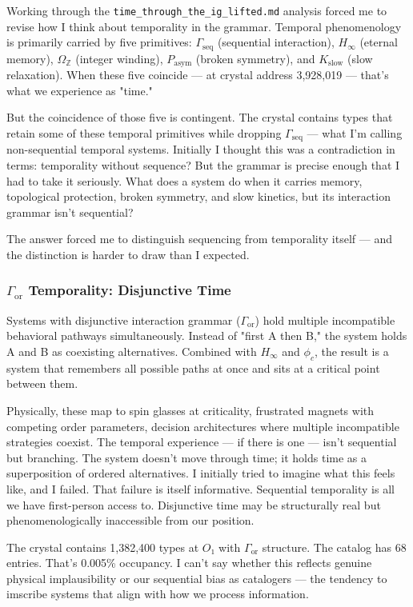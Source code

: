 \documentclass[12pt,a4paper]{article}
\begin{document}
Working through the \texttt{time\_through\_the\_ig\_lifted.md} analysis forced me to revise how I think about temporality in the grammar. Temporal phenomenology is primarily carried by five primitives: $\Gamma_\text{seq}$ (sequential interaction), $H_{\infty}$ (eternal memory), $\Omega_\mathbb{Z}$ (integer winding), $P_\text{asym}$ (broken symmetry), and $K_\text{slow}$ (slow relaxation). When these five coincide --- at crystal address 3,928,019 --- that's what we experience as "time."

But the coincidence of those five is contingent. The crystal contains types that retain some of these temporal primitives while dropping $\Gamma_\text{seq}$ --- what I'm calling non-sequential temporal systems. Initially I thought this was a contradiction in terms: temporality without sequence? But the grammar is precise enough that I had to take it seriously. What does a system do when it carries memory, topological protection, broken symmetry, and slow kinetics, but its interaction grammar isn't sequential?

The answer forced me to distinguish sequencing from temporality itself --- and the distinction is harder to draw than I expected.

\subsubsection{$\Gamma_\text{or}$ Temporality: Disjunctive Time}

Systems with disjunctive interaction grammar ($\Gamma_\text{or}$) hold multiple incompatible behavioral pathways simultaneously. Instead of "first A then B," the system holds A and B as coexisting alternatives. Combined with $H_{\infty}$ and $\phi_c$, the result is a system that remembers all possible paths at once and sits at a critical point between them.

Physically, these map to spin glasses at criticality, frustrated magnets with competing order parameters, decision architectures where multiple incompatible strategies coexist. The temporal experience --- if there is one --- isn't sequential but branching. The system doesn't move through time; it holds time as a superposition of ordered alternatives. I initially tried to imagine what this feels like, and I failed. That failure is itself informative. Sequential temporality is all we have first-person access to. Disjunctive time may be structurally real but phenomenologically inaccessible from our position.

The crystal contains 1,382,400 types at $O₁$ with $\Gamma_\text{or}$ structure. The catalog has 68 entries. That's 0.005\% occupancy. I can't say whether this reflects genuine physical implausibility or our sequential bias as catalogers --- the tendency to imscribe systems that align with how we process information.
\end{document}
